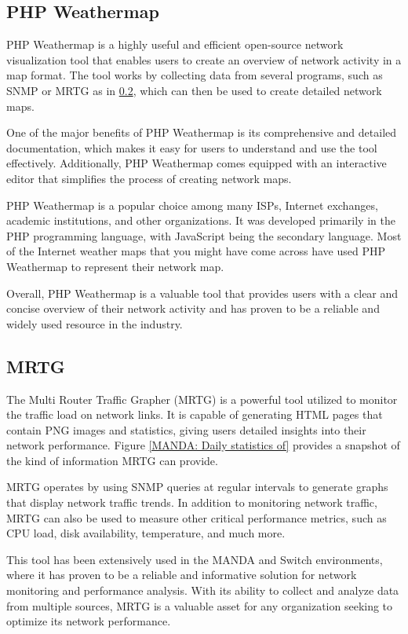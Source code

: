 \documentclass[sigconf,authorversion,nonacm]{acmart}
\begin{document}
\subsection{PHP Weathermap}

PHP Weathermap is a highly useful and efficient open-source network visualization tool that enables users to create an overview of network activity in a map format. The tool works by collecting data from several programs, such as SNMP or MRTG as in  \ref{MRTG}, which can then be used to create detailed network maps. 

One of the major benefits of PHP Weathermap is its comprehensive and detailed documentation, which makes it easy for users to understand and use the tool effectively. Additionally, PHP Weathermap comes equipped with an interactive editor that simplifies the process of creating network maps. 

PHP Weathermap is a popular choice among many ISPs, Internet exchanges, academic institutions, and other organizations. It was developed primarily in the PHP programming language, with JavaScript being the secondary language. Most of the Internet weather maps that you might have come across have used PHP Weathermap to represent their network map. 

Overall, PHP Weathermap is a valuable tool that provides users with a clear and concise overview of their network activity and has proven to be a reliable and widely used resource in the industry.

\subsection{MRTG}\label{MRTG}
The Multi Router Traffic Grapher (MRTG) is a powerful tool utilized to monitor the traffic load on network links. It is capable of generating HTML pages that contain PNG images and statistics, giving users detailed insights into their network performance. Figure \ref{MANDA: Daily statistics of} provides a snapshot of the kind of information MRTG can provide. 

MRTG operates by using SNMP queries at regular intervals to generate graphs that display network traffic trends. In addition to monitoring network traffic, MRTG can also be used to measure other critical performance metrics, such as CPU load, disk availability, temperature, and much more. 

This tool has been extensively used in the MANDA and Switch environments, where it has proven to be a reliable and informative solution for network monitoring and performance analysis. With its ability to collect and analyze data from multiple sources, MRTG is a valuable asset for any organization seeking to optimize its network performance.
\end{document}
